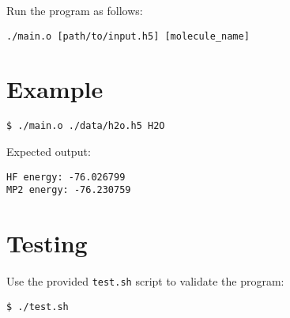 \documentclass{article}
\begin{document}
Run the program as follows:
\begin{verbatim}
./main.o [path/to/input.h5] [molecule_name]
\end{verbatim}

\section*{Example}
\begin{verbatim}
$ ./main.o ./data/h2o.h5 H2O
\end{verbatim}

Expected output:
\begin{verbatim}
HF energy: -76.026799
MP2 energy: -76.230759
\end{verbatim}

\section*{Testing}
Use the provided \texttt{test.sh} script to validate the program:
\begin{verbatim}
$ ./test.sh
\end{verbatim}
\end{document}

